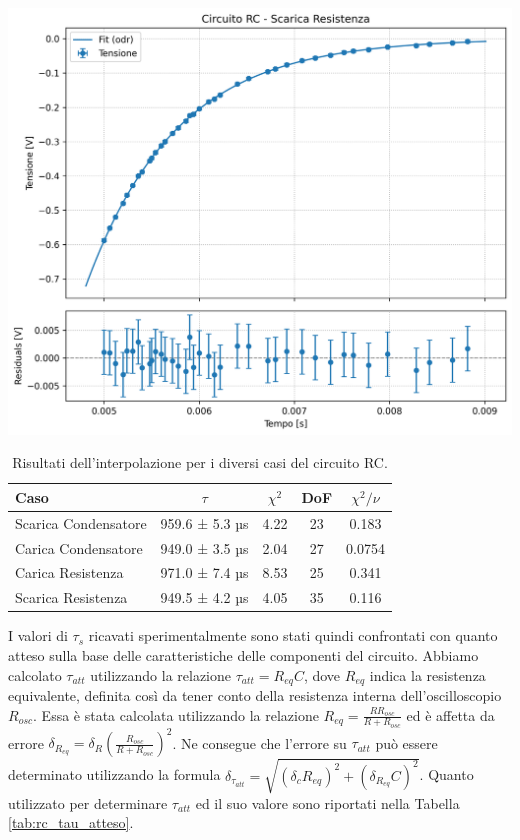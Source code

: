 \documentclass[a4paper]{article}
\begin{document}
\begin{center}
    \label{fig: rc carica resistenza}
    \includegraphics[width=0.9\linewidth]{grafici/rc_scarica_resistenza.png}
    \label{fig: rc scarica resistenza}
\end{center}

\begin{table}[htbp]
\centering
\begin{tabular}{|l|cccc|}
\hline
Caso & $\tau$ & $\chi^2$ & DoF & $\chi^2/\nu$ \\ %
\hline\hline
Scarica Condensatore & 959.6 ± 5.3 µs & 4.22 & 23 & 0.183 \\
Carica Condensatore  & 949.0 ± 3.5 µs & 2.04 & 27 & 0.0754 \\
Carica Resistenza    & 971.0 ± 7.4 µs & 8.53 & 25 & 0.341 \\
Scarica Resistenza   & 949.5 ± 4.2 µs & 4.05 & 35 & 0.116 \\
\hline
\end{tabular}
\caption{Risultati dell'interpolazione per i diversi casi del circuito RC.}
\label{tab:rc_fit_results} %
\end{table}


I valori di $\tau_s$ ricavati sperimentalmente sono stati quindi confrontati con quanto atteso sulla base delle caratteristiche delle componenti del circuito. Abbiamo calcolato $\tau_{att}$ utilizzando la relazione $\tau_{att} = R_{eq}C$, dove $ R_{eq}$ indica la resistenza equivalente, definita così da tener conto della resistenza interna dell'oscilloscopio $R_{osc}$. Essa è stata calcolata utilizzando la relazione $R_{eq}=\frac{RR_{osc}}{R+R_{osc}}$ ed è affetta da errore $\delta_{R_{eq}} = \delta_R(\frac{R_{osc}}{R+R_{osc}})^2$. Ne consegue che l'errore su $\tau_{att}$ può essere determinato utilizzando la formula $\delta_{\tau_{att}}= \sqrt{(\delta_{c}R_{eq})^2 + (\delta_{R_{eq}}C)^2}$.
Quanto utilizzato per determinare $\tau_{att}$ ed il suo valore sono riportati nella Tabella \ref{tab:rc_tau_atteso}.
\end{document}
